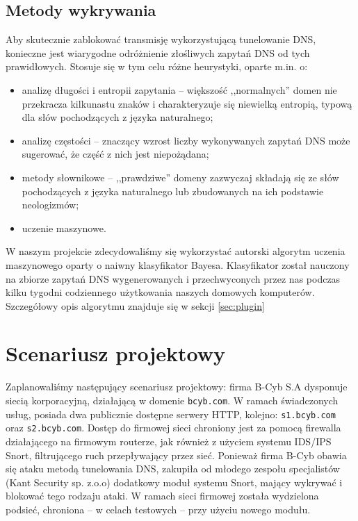 \documentclass{eiti-raport}
\begin{document}
\subsection{Metody wykrywania} \label{sec:wykrywanie}
Aby skutecznie zablokować transmisję wykorzystującą tunelowanie DNS, konieczne jest wiarygodne odróżnienie złośliwych zapytań DNS od tych prawidłowych. Stosuje się w tym celu różne heurystyki, oparte m.in. o:
\begin{itemize}
	\item analizę długości i entropii zapytania -- większość ,,normalnych'' domen nie przekracza kilkunastu znaków i charakteryzuje się niewielką entropią, typową dla słów pochodzących z języka naturalnego;
	\item analizę częstości -- znaczący wzrost liczby wykonywanych zapytań DNS może sugerować, że część z nich jest niepożądana;
	\item metody słownikowe -- ,,prawdziwe'' domeny zazwyczaj składają się ze słów pochodzących z języka naturalnego lub zbudowanych na ich podstawie neologizmów;
	\item uczenie maszynowe.
\end{itemize}
W naszym projekcie zdecydowaliśmy się wykorzystać autorski algorytm uczenia maszynowego oparty o naiwny klasyfikator Bayesa. Klasyfikator został nauczony na zbiorze zapytań DNS wygenerowanych i przechwyconych przez nas podczas kilku tygodni codziennego użytkowania naszych domowych komputerów. Szczegółowy opis algorytmu znajduje się w sekcji \ref{sec:plugin} 

\section{Scenariusz projektowy} \label{sec:scenariusz}
Zaplanowaliśmy następujący scenariusz projektowy: firma B-Cyb S.A dysponuje siecią korporacyjną, działającą w domenie \texttt{bcyb.com}. W ramach świadczonych usług, posiada dwa publicznie dostępne serwery HTTP, kolejno: \texttt{s1.bcyb.com} oraz \texttt{s2.bcyb.com}. Dostęp do firmowej sieci chroniony jest za pomocą firewalla działającego na firmowym routerze, jak również z użyciem systemu IDS/IPS Snort, filtrującego ruch przepływający przez sieć. Ponieważ firma B-Cyb obawia się ataku metodą tunelowania DNS, zakupiła od młodego zespołu specjalistów (Kant Security sp. z.o.o) dodatkowy moduł systemu Snort, mający wykrywać i blokować tego rodzaju ataki. W ramach sieci firmowej została wydzielona podsieć, chroniona -- w celach testowych -- przy użyciu nowego modułu. 
\end{document}
